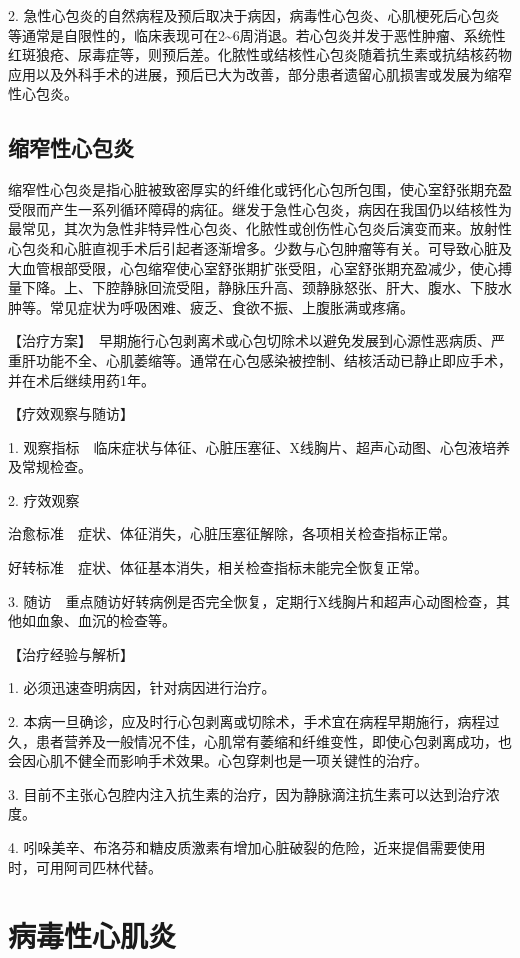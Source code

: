 2.
急性心包炎的自然病程及预后取决于病因，病毒性心包炎、心肌梗死后心包炎等通常是自限性的，临床表现可在2\textasciitilde{}6周消退。若心包炎并发于恶性肿瘤、系统性红斑狼疮、尿毒症等，则预后差。化脓性或结核性心包炎随着抗生素或抗结核药物应用以及外科手术的进展，预后已大为改善，部分患者遗留心肌损害或发展为缩窄性心包炎。

\subsection{缩窄性心包炎}

缩窄性心包炎是指心脏被致密厚实的纤维化或钙化心包所包围，使心室舒张期充盈受限而产生一系列循环障碍的病征。继发于急性心包炎，病因在我国仍以结核性为最常见，其次为急性非特异性心包炎、化脓性或创伤性心包炎后演变而来。放射性心包炎和心脏直视手术后引起者逐渐增多。少数与心包肿瘤等有关。可导致心脏及大血管根部受限，心包缩窄使心室舒张期扩张受阻，心室舒张期充盈减少，使心搏量下降。上、下腔静脉回流受阻，静脉压升高、颈静脉怒张、肝大、腹水、下肢水肿等。常见症状为呼吸困难、疲乏、食欲不振、上腹胀满或疼痛。

【治疗方案】　早期施行心包剥离术或心包切除术以避免发展到心源性恶病质、严重肝功能不全、心肌萎缩等。通常在心包感染被控制、结核活动已静止即应手术，并在术后继续用药1年。

【疗效观察与随访】

1.
观察指标　临床症状与体征、心脏压塞征、X线胸片、超声心动图、心包液培养及常规检查。

2. 疗效观察

治愈标准　症状、体征消失，心脏压塞征解除，各项相关检查指标正常。

好转标准　症状、体征基本消失，相关检查指标未能完全恢复正常。

3.
随访　重点随访好转病例是否完全恢复，定期行X线胸片和超声心动图检查，其他如血象、血沉的检查等。

【治疗经验与解析】

1. 必须迅速查明病因，针对病因进行治疗。

2.
本病一旦确诊，应及时行心包剥离或切除术，手术宜在病程早期施行，病程过久，患者营养及一般情况不佳，心肌常有萎缩和纤维变性，即使心包剥离成功，也会因心肌不健全而影响手术效果。心包穿刺也是一项关键性的治疗。

3.
目前不主张心包腔内注入抗生素的治疗，因为静脉滴注抗生素可以达到治疗浓度。

4.
吲哚美辛、布洛芬和糖皮质激素有增加心脏破裂的危险，近来提倡需要使用时，可用阿司匹林代替。


\section{病毒性心肌炎}

